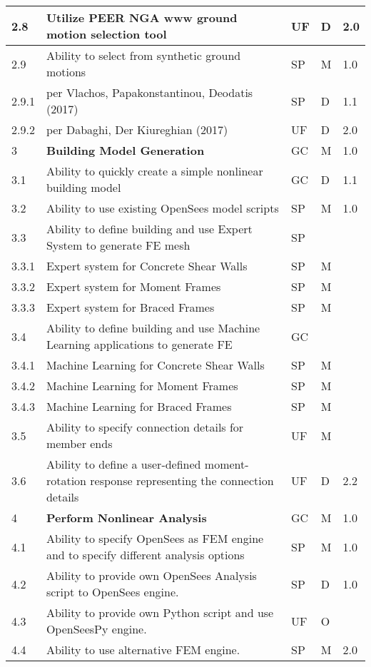 \begin{longtable}{| p{} | p{} | p{} | p{} |  p{} |}
      2.8 & Utilize PEER NGA www ground motion selection tool  & UF & D & 2.0 \\ \hline
      2.9 & Ability to select from synthetic ground motions & SP & M & 1.0  \\
      2.9.1 & per Vlachos, Papakonstantinou, Deodatis (2017) & SP & D & 1.1  \\ 
      2.9.2 & per Dabaghi, Der Kiureghian (2017) & UF & D & 2.0 \\ \hline
	3 & \textbf{Building Model Generation} & GC & M & 1.0 \\ \hline
	3.1 & Ability to quickly create a simple nonlinear building model & GC & D & 1.1 \\ \hline
	3.2 & Ability to use existing OpenSees model scripts & SP & M & 1.0 \\ \hline
	3.3  & Ability to define building and use Expert System to generate FE mesh & SP & &  \\ \hline
	3.3.1 & Expert system for Concrete Shear Walls & SP & M &  \\ \hline
	3.3.2 & Expert system for Moment Frames & SP & M &  \\ \hline
	3.3.3 & Expert system for  Braced Frames & SP & M &   \\ \hline
	3.4 & Ability to define building and use Machine Learning applications to generate FE & GC &  &  \\ \hline
	3.4.1 & Machine Learning for Concrete Shear Walls & SP & M &  \\ \hline
	3.4.2 & Machine Learning for Moment Frames & SP & M &  \\ \hline
	3.4.3 & Machine Learning for Braced Frames & SP & M &   \\ \hline
	3.5 & Ability to specify connection details for member ends & UF & M &  \\ \hline
	3.6 & Ability to define a user-defined moment-rotation response representing the connection details & UF & D & 2.2 \\ \hline
	4 & \textbf{Perform Nonlinear Analysis} & GC & M & 1.0 \\ \hline
	4.1 & Ability to specify OpenSees as FEM engine and to specify different analysis options & SP & M & 1.0 \\ \hline
	4.2 & Ability to provide own OpenSees Analysis script to OpenSees engine. & SP & D & 1.0 \\ \hline
	4.3 & Ability to provide own Python script and use OpenSeesPy engine. & UF & O &  \\ \hline
	4.4 & Ability to use alternative FEM engine. & SP & M & 2.0 \\ \hline

\end{longtable}
